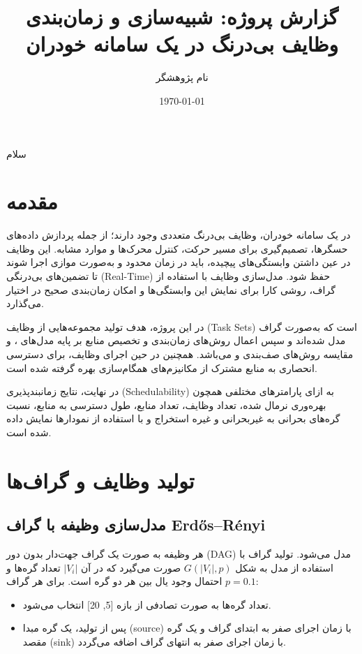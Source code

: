 \documentclass[12pt,a4paper]{report}
\begin{document}
\title{گزارش پروژه: شبیه‌سازی و زمان‌بندی وظایف بی‌درنگ در یک سامانه خودران}
\author{نام پژوهشگر}
\date{\today}
\maketitle
\begin{center}
\Huge سلام
\end{center}

\tableofcontents

\chapter{مقدمه}
در یک سامانه خودران، وظایف بی‌درنگ متعددی وجود دارند؛ از جمله پردازش داده‌های حسگرها، تصمیم‌گیری برای مسیر حرکت، کنترل محرک‌ها و موارد مشابه. این وظایف در عین داشتن وابستگی‌های پیچیده، باید در زمان محدود و به‌صورت موازی اجرا شوند تا تضمین‌های بی‌درنگی (Real-Time) حفظ شود. مدل‌سازی وظایف با استفاده از گراف، روشی کارا برای نمایش این وابستگی‌ها و امکان زمان‌بندی صحیح در اختیار می‌گذارد.

در این پروژه، هدف تولید مجموعه‌هایی از وظایف (Task Sets) است که به‌صورت گراف مدل شده‌اند و سپس اعمال روش‌های زمان‌بندی و تخصیص منابع بر پایه مدل‌های ،  و مقایسه روش‌های صف‌بندی  و  می‌باشد. همچنین در حین اجرای وظایف، برای دسترسی انحصاری به منابع مشترک از مکانیزم‌های همگام‌سازی بهره گرفته شده است.

در نهایت، نتایج زمانبندپذیری (Schedulability) به ازای پارامترهای مختلفی همچون بهره‌وری نرمال شده، تعداد وظایف، تعداد منابع، طول دسترسی به منابع، نسبت گره‌های بحرانی به غیربحرانی و غیره استخراج و با استفاده از نمودارها نمایش داده شده است.

\chapter{تولید وظایف و گراف‌ها}
\section{مدل‌سازی وظیفه با گراف Erdős–Rényi}
هر وظیفه به صورت یک گراف جهت‌دار بدون دور (DAG) مدل می‌شود. تولید گراف با استفاده از مدل  به شکل $G(|V_i|, p)$ صورت می‌گیرد که در آن $|V_i|$ تعداد گره‌ها و $p=0.1$ احتمال وجود یال بین هر دو گره است. برای هر گراف:
\begin{itemize}
\item تعداد گره‌ها به صورت تصادفی از بازه [5, 20] انتخاب می‌شود.
\item پس از تولید، یک گره مبدا (source) با زمان اجرای صفر به ابتدای گراف و یک گره مقصد (sink) با زمان اجرای صفر به انتهای گراف اضافه می‌گردد.
\end{itemize}
\end{document}
